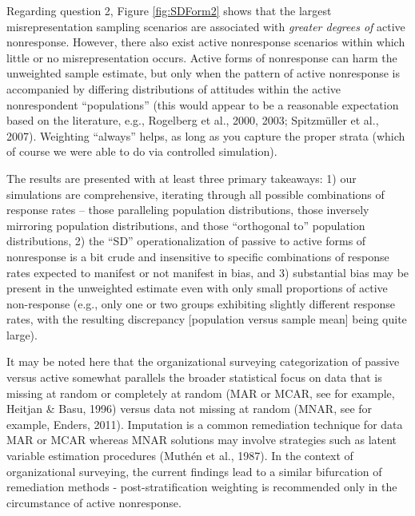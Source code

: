 \documentclass[
  man,mask]{apa7}
\begin{document}
Regarding question 2, Figure \ref{fig:SDForm2} shows that the largest misrepresentation sampling scenarios are associated with \emph{greater degrees of} active nonresponse. However, there also exist active nonresponse scenarios within which little or no misrepresentation occurs. Active forms of nonresponse can harm the unweighted sample estimate, but only when the pattern of active nonresponse is accompanied by differing distributions of attitudes within the active nonrespondent ``populations'' (this would appear to be a reasonable expectation based on the literature, e.g., Rogelberg et al., 2000, 2003; Spitzmüller et al., 2007). Weighting ``always'' helps, as long as you capture the proper strata (which of course we were able to do via controlled simulation).

The results are presented with at least three primary takeaways: 1) our simulations are comprehensive, iterating through all possible combinations of response rates -- those paralleling population distributions, those inversely mirroring population distributions, and those ``orthogonal to'' population distributions, 2) the ``SD'' operationalization of passive to active forms of nonresponse is a bit crude and insensitive to specific combinations of response rates expected to manifest or not manifest in bias, and 3) substantial bias may be present in the unweighted estimate even with only small proportions of active non-response (e.g., only one or two groups exhibiting slightly different response rates, with the resulting discrepancy {[}population versus sample mean{]} being quite large).

It may be noted here that the organizational surveying categorization of passive versus active somewhat parallels the broader statistical focus on data that is missing at random or completely at random (MAR or MCAR, see for example, Heitjan \& Basu, 1996) versus data not missing at random (MNAR, see for example, Enders, 2011). Imputation is a common remediation technique for data MAR or MCAR whereas MNAR solutions may involve strategies such as latent variable estimation procedures (Muthén et al., 1987). In the context of organizational surveying, the current findings lead to a similar bifurcation of remediation methods - post-stratification weighting is recommended only in the circumstance of active nonresponse.
\end{document}
